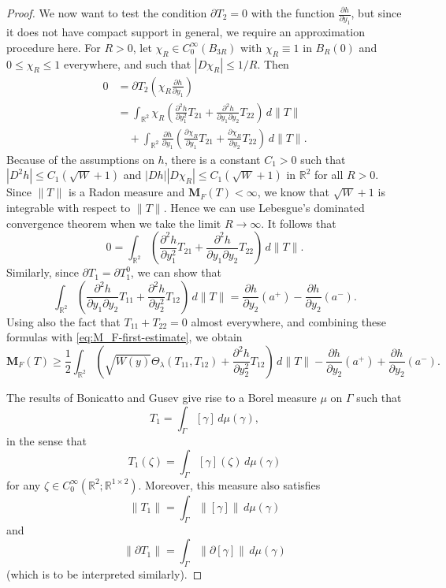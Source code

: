\documentclass[a4paper]{article}
\newcommand{\R}{\mathbb{R}}
\newcommand{\M}{\mathbf{M}}
\newcommand{\dd}[2]{\frac{\partial #1}{\partial #2}}
\theoremstyle{definition}
\theoremstyle{remark}
\begin{document}
\begin{proof}
We now want to test the condition $\partial T_2 = 0$ with the function
$\dd{h}{y_1}$, but since it does not have compact support in general, we
require an approximation procedure here. For $R > 0$, let
$\chi_R \in C_0^\infty(B_{3R})$ with $\chi_R \equiv 1$ in $B_R(0)$
and $0 \le \chi_R \le 1$ everywhere, and such that $|D\chi_R| \le 1/R$.
Then
\[
\begin{split}
0 & = \partial T_2\left(\chi_R \dd{h}{y_1}\right) \\
& = \int_{\R^2} \chi_R \left(\frac{\partial^2 h}{\partial y_1^2} T_{21} + \frac{\partial^2 h}{\partial y_1 \partial y_2} T_{22}\right) \, d\|T\| \\
& \quad + \int_{\R^2} \dd{h}{y_1} \left(\dd{\chi_R}{y_1} T_{21} + \dd{\chi_R}{y_2} T_{22}\right) \, d\|T\|.
\end{split}
\]
Because of the assumptions on $h$, there is a constant $C_1 > 0$ such that
$|D^2 h| \le C_1 (\sqrt{W} + 1)$ and $|Dh| |D\chi_R| \le C_1 (\sqrt{W} + 1)$ in $\R^2$ for all $R> 0$.
Since $\|T\|$ is a Radon measure and  $\M_F(T) < \infty$, we know that $\sqrt{W} + 1$ is integrable with
respect to $\|T\|$. Hence we can use Lebesgue's dominated convergence
theorem when we take the limit $R \to \infty$. It follows that
\[
0 = \int_{\R^2} \left(\frac{\partial^2 h}{\partial y_1^2} T_{21} + \frac{\partial^2 h}{\partial y_1 \partial y_2} T_{22}\right) \, d\|T\|.
\]
Similarly, since $\partial T_1 = \partial T_1^0$, we can show that
\[
\int_{\R^2} \left(\frac{\partial^2 h}{\partial y_1 \partial y_2} T_{11} + \frac{\partial^2 h}{\partial y_2^2} T_{12}\right) \, d\|T\| = \dd{h}{y_2}(a^+) - \dd{h}{y_2}(a^-).
\]
Using also the fact that $T_{11} + T_{22} = 0$ almost everywhere, and
combining these formulas with \eqref{eq:M_F-first-estimate}, we obtain
\begin{equation} \label{eq:M_F-second-estimate}
\M_F(T) \ge \frac{1}{2} \int_{\R^2} \left(\sqrt{W(y)} \Theta_\lambda(T_{11}, T_{12}) + \frac{\partial^2 h}{\partial y_2^2} T_{12}\right) \, d\|T\| - \dd{h}{y_2}(a^+) + \dd{h}{y_2}(a^-).
\end{equation}

The results of Bonicatto and Gusev \cite{Bonicatto-Gusev:22} give rise to a Borel measure $\mu$ on $\Gamma$
such that
\begin{equation} \label{eq:decomposition}
T_1 = \int_\Gamma [\gamma] \, d\mu(\gamma),
\end{equation}
in the sense that
\[
T_1(\zeta) = \int_\Gamma [\gamma](\zeta) \, d\mu(\gamma)
\]
for any $\zeta \in C_0^\infty(\R^2; \R^{1 \times 2})$. Moreover,
this measure also satisfies
\begin{equation} \label{eq:decomposition-total-variation}
\|T_1\| = \int_\Gamma \|[\gamma]\| \, d\mu(\gamma)
\end{equation}
and
\begin{equation} \label{eq:decomposition-boundary}
\|\partial T_1\| = \int_\Gamma \|\partial [\gamma]\| \, d\mu(\gamma)
\end{equation}
(which is to be interpreted similarly).


\end{proof}
\end{document}
